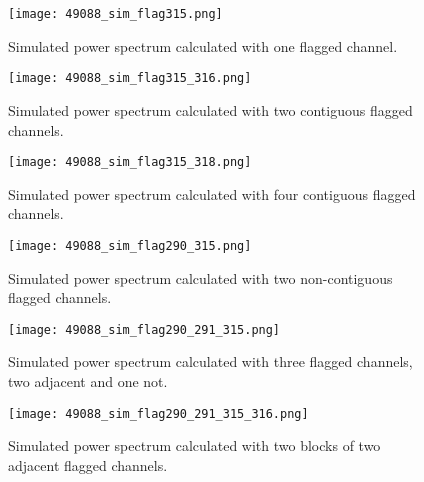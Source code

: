 \documentclass[12pt]{article}
\begin{document}
\begin{figure}[p]
	\centering
	\texttt{[image: 49088\_sim\_flag315.png]}
	\caption[Model power spectrum calculated with flagged time integrations and one flagged channel]{Simulated power spectrum calculated with one flagged channel.}
	\label{fig:sim_flag_chan315}
\end{figure}

\begin{figure}[p]
	\centering
	\texttt{[image: 49088\_sim\_flag315\_316.png]}
	\caption[Model power spectrum calculated with flagged time integrations and two contiguous flagged channels]{Simulated power spectrum calculated with two contiguous flagged channels.}
	\label{fig:sim_flag_chan315_316}
\end{figure}

\begin{figure}[p]
	\centering
	\texttt{[image: 49088\_sim\_flag315\_318.png]}
	\caption[Model power spectrum calculated with flagged time integrations and four contiguous flagged channels]{Simulated power spectrum calculated with four contiguous flagged channels.}
	\label{fig:sim_flag_chan315_318}
\end{figure}

\begin{figure}[p]
	\centering
	\texttt{[image: 49088\_sim\_flag290\_315.png]}
	\caption[Model power spectrum calculated with flagged time integrations and two non-contiguous flagged channels]{Simulated power spectrum calculated with two non-contiguous flagged channels.}
	\label{fig:sim_flag_chan290_315}
\end{figure}

\begin{figure}[p]
	\centering
	\texttt{[image: 49088\_sim\_flag290\_291\_315.png]}
	\caption[Model power spectrum calculated with flagged time integrations and three flagged channels (two contiguous, one not)]{Simulated power spectrum calculated with three flagged channels, two adjacent and one not.}
	\label{fig:sim_flag_chan290_291_315}
\end{figure}

\begin{figure}[p]
	\centering
	\texttt{[image: 49088\_sim\_flag290\_291\_315\_316.png]}
	\caption[Model power spectrum calculated with flagged time integrations and four flagged channels (two blocks of two channels)]{Simulated power spectrum calculated with two blocks of two adjacent flagged channels.}
	\label{fig:sim_flag_chan290_291_315_316}
\end{figure}
\end{document}
